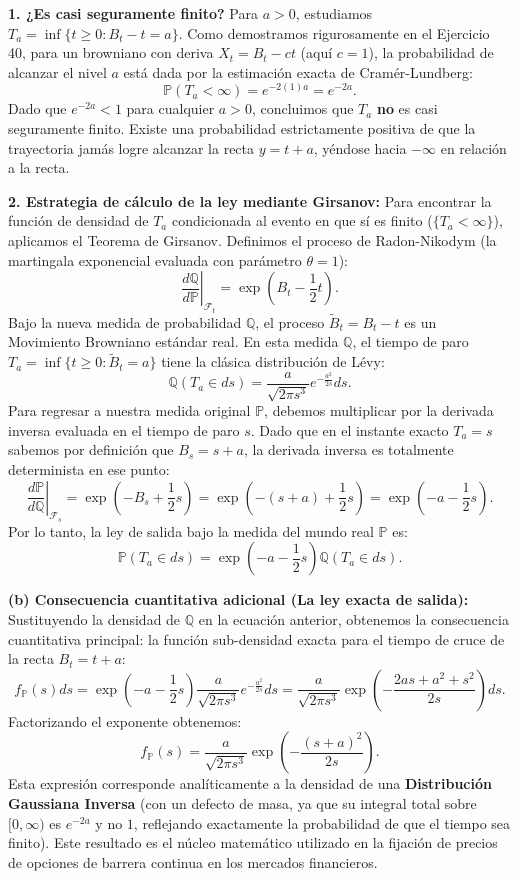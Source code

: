\documentclass[11pt, letterpaper]{article}
\begin{document}
\begin{solucion}
    \textbf{1. ¿Es casi seguramente finito?}
    Para $a > 0$, estudiamos $T_a = \inf\{t \ge 0 : B_t - t = a\}$.
    Como demostramos rigurosamente en el Ejercicio 40, para un browniano con deriva $X_t = B_t - ct$ (aquí $c = 1$), la probabilidad de alcanzar el nivel $a$ está dada por la estimación exacta de Cramér-Lundberg:
    \[ \mathbb{P}(T_a < \infty) = e^{-2(1)a} = e^{-2a}. \]
    Dado que $e^{-2a} < 1$ para cualquier $a > 0$, concluimos que $T_a$ \textbf{no} es casi seguramente finito. Existe una probabilidad estrictamente positiva de que la trayectoria jamás logre alcanzar la recta $y = t + a$, yéndose hacia $-\infty$ en relación a la recta.

    \textbf{2. Estrategia de cálculo de la ley mediante Girsanov:}
    Para encontrar la función de densidad de $T_a$ condicionada al evento en que sí es finito ($\{T_a < \infty\}$), aplicamos el Teorema de Girsanov.
    Definimos el proceso de Radon-Nikodym (la martingala exponencial evaluada con parámetro $\theta = 1$):
    \[ \left.\frac{d\mathbb{Q}}{d\mathbb{P}}\right|_{\mathcal{F}_t} = \exp\left( B_t - \frac{1}{2}t \right). \]
    Bajo la nueva medida de probabilidad $\mathbb{Q}$, el proceso $\tilde{B}_t = B_t - t$ es un Movimiento Browniano estándar real.
    En esta medida $\mathbb{Q}$, el tiempo de paro $T_a = \inf\{t \ge 0 : \tilde{B}_t = a\}$ tiene la clásica distribución de Lévy:
    \[ \mathbb{Q}(T_a \in ds) = \frac{a}{\sqrt{2\pi s^3}} e^{-\frac{a^2}{2s}} ds. \]
    Para regresar a nuestra medida original $\mathbb{P}$, debemos multiplicar por la derivada inversa evaluada en el tiempo de paro $s$. Dado que en el instante exacto $T_a = s$ sabemos por definición que $B_s = s + a$, la derivada inversa es totalmente determinista en ese punto:
    \[ \left.\frac{d\mathbb{P}}{d\mathbb{Q}}\right|_{\mathcal{F}_s} = \exp\left( -B_s + \frac{1}{2}s \right) = \exp\left( -(s + a) + \frac{1}{2}s \right) = \exp\left( -a - \frac{1}{2}s \right). \]
    Por lo tanto, la ley de salida bajo la medida del mundo real $\mathbb{P}$ es:
    \[ \mathbb{P}(T_a \in ds) = \exp\left( -a - \frac{1}{2}s \right) \mathbb{Q}(T_a \in ds). \]
    
    \vspace{3mm}
    \textbf{(b) Consecuencia cuantitativa adicional (La ley exacta de salida):}
    Sustituyendo la densidad de $\mathbb{Q}$ en la ecuación anterior, obtenemos la consecuencia cuantitativa principal: la función sub-densidad exacta para el tiempo de cruce de la recta $B_t = t + a$:
    \[ f_{\mathbb{P}}(s) ds = \exp\left( -a - \frac{1}{2}s \right) \frac{a}{\sqrt{2\pi s^3}} e^{-\frac{a^2}{2s}} ds = \frac{a}{\sqrt{2\pi s^3}} \exp\left( -\frac{2as + a^2 + s^2}{2s} \right) ds. \]
    Factorizando el exponente obtenemos:
    \[ f_{\mathbb{P}}(s) = \frac{a}{\sqrt{2\pi s^3}} \exp\left( -\frac{(s+a)^2}{2s} \right). \]
    Esta expresión corresponde analíticamente a la densidad de una \textbf{Distribución Gaussiana Inversa} (con un defecto de masa, ya que su integral total sobre $[0, \infty)$ es $e^{-2a}$ y no $1$, reflejando exactamente la probabilidad de que el tiempo sea finito). Este resultado es el núcleo matemático utilizado en la fijación de precios de opciones de barrera continua en los mercados financieros.
\end{solucion}
\end{document}
